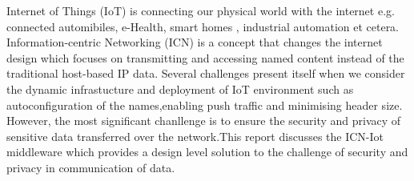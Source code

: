 Internet of Things (IoT) is connecting our physical world with the internet e.g. connected automibiles, e-Health, smart homes , industrial automation et cetera. Information-centric Networking (ICN) is a concept that changes the internet design which focuses on transmitting and accessing named content instead of the traditional host-based IP data. Several challenges present itself when we consider the dynamic infrastucture and deployment of IoT environment such as autoconfiguration of the names,enabling push traffic and minimising header size. However, the most significant chanllenge is to ensure the security and privacy of sensitive data transferred over the network.This report discusses the ICN-Iot middleware which provides a design level solution to the challenge of security and privacy in communication of data.
